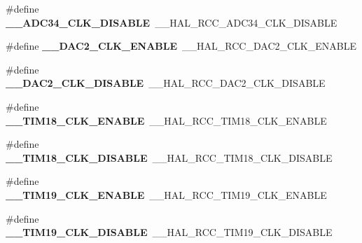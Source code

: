 \begin{DoxyCompactItemize}
\item 
\mbox{\label{group___h_a_l___r_c_c___aliased_ga7d658c3accc90e210938a08bb313a6be}} 
\#define {\bfseries \+\_\+\+\_\+\+A\+D\+C34\+\_\+\+C\+L\+K\+\_\+\+D\+I\+S\+A\+B\+LE}~\+\_\+\+\_\+\+H\+A\+L\+\_\+\+R\+C\+C\+\_\+\+A\+D\+C34\+\_\+\+C\+L\+K\+\_\+\+D\+I\+S\+A\+B\+LE
\item 
\mbox{\label{group___h_a_l___r_c_c___aliased_gae4c367c2fb13b1c443b9c2ead24c2589}} 
\#define {\bfseries \+\_\+\+\_\+\+D\+A\+C2\+\_\+\+C\+L\+K\+\_\+\+E\+N\+A\+B\+LE}~\+\_\+\+\_\+\+H\+A\+L\+\_\+\+R\+C\+C\+\_\+\+D\+A\+C2\+\_\+\+C\+L\+K\+\_\+\+E\+N\+A\+B\+LE
\item 
\mbox{\label{group___h_a_l___r_c_c___aliased_gacfc9ef4fb5d3565351542b14e6d7830e}} 
\#define {\bfseries \+\_\+\+\_\+\+D\+A\+C2\+\_\+\+C\+L\+K\+\_\+\+D\+I\+S\+A\+B\+LE}~\+\_\+\+\_\+\+H\+A\+L\+\_\+\+R\+C\+C\+\_\+\+D\+A\+C2\+\_\+\+C\+L\+K\+\_\+\+D\+I\+S\+A\+B\+LE
\item 
\mbox{\label{group___h_a_l___r_c_c___aliased_ga299d99f2c8deaffbee002dd70a5c8f15}} 
\#define {\bfseries \+\_\+\+\_\+\+T\+I\+M18\+\_\+\+C\+L\+K\+\_\+\+E\+N\+A\+B\+LE}~\+\_\+\+\_\+\+H\+A\+L\+\_\+\+R\+C\+C\+\_\+\+T\+I\+M18\+\_\+\+C\+L\+K\+\_\+\+E\+N\+A\+B\+LE
\item 
\mbox{\label{group___h_a_l___r_c_c___aliased_gad29b4581580af1d318589d2c0403f4ab}} 
\#define {\bfseries \+\_\+\+\_\+\+T\+I\+M18\+\_\+\+C\+L\+K\+\_\+\+D\+I\+S\+A\+B\+LE}~\+\_\+\+\_\+\+H\+A\+L\+\_\+\+R\+C\+C\+\_\+\+T\+I\+M18\+\_\+\+C\+L\+K\+\_\+\+D\+I\+S\+A\+B\+LE
\item 
\mbox{\label{group___h_a_l___r_c_c___aliased_ga6e908d1b2908430d1ed2af109dd81d31}} 
\#define {\bfseries \+\_\+\+\_\+\+T\+I\+M19\+\_\+\+C\+L\+K\+\_\+\+E\+N\+A\+B\+LE}~\+\_\+\+\_\+\+H\+A\+L\+\_\+\+R\+C\+C\+\_\+\+T\+I\+M19\+\_\+\+C\+L\+K\+\_\+\+E\+N\+A\+B\+LE
\item 
\mbox{\label{group___h_a_l___r_c_c___aliased_ga3b32538dedb67006d1b9c9aa210ed5f3}} 
\#define {\bfseries \+\_\+\+\_\+\+T\+I\+M19\+\_\+\+C\+L\+K\+\_\+\+D\+I\+S\+A\+B\+LE}~\+\_\+\+\_\+\+H\+A\+L\+\_\+\+R\+C\+C\+\_\+\+T\+I\+M19\+\_\+\+C\+L\+K\+\_\+\+D\+I\+S\+A\+B\+LE

\end{DoxyCompactItemize}
